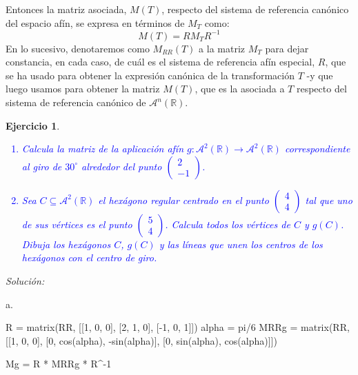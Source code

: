 \documentclass{amsart}
\newtheorem{ejer}{Ejercicio}
\begin{document}
\begin{tcolorbox}[colback = orange!60!white,title = Cuestiones teóricas previas]
Entonces la matriz asociada, $M(T)$, respecto del sistema de referencia canónico del espacio afín,  se expresa en términos de  $M_{T}$ como:
$$M(T)=RM_{T}R^{-1}$$
En lo sucesivo, denotaremos como $M_{RR}(T)$ a la matriz $M_T$ para dejar constancia, en cada caso, de cuál es el sistema de referencia afín especial, $R$, que se ha usado para obtener la expresión canónica de la transformación $T$ -y que luego usamos para obtener la matriz $M(T)$, que es la asociada a $T$ respecto del sistema de referencia canónico de $\mathcal{A}^n(\mathbb R)$.

\end{tcolorbox} 
\newpage

\begin{ejer}	
\textcolor{blue}{\begin{enumerate} 
\item[a)] Calcula la matriz de la aplicación af\'{i}n $g:\mathcal{A}^2(\mathbb R) \to \mathcal{A}^2(\mathbb R)$ correspondiente al {\sc giro} de $30^\circ$ alrededor del punto 
$\left( \begin{array}{r} 2  \\ -1 \end{array} \right)$.
\item[b)] Sea $C \subseteq \mathcal{A}^2(\mathbb R)$ el hex\'agono regular centrado en el punto $\left( \begin{array}{r} 4  \\ 4 \end{array} \right)$ tal que uno de sus v\'ertices
es el punto $\left( \begin{array}{r} 5  \\ 4 \end{array} \right)$. Calcula todos los v\'ertices de $C$ y $g(C)$. Dibuja los hexágonos $C$, $g(C)$ y las líneas que unen los centros de los hexágonos con el centro de giro.
\end{enumerate}}
\end{ejer}

{\it Solución:}


a.

\begin{sageblock}
R = matrix(RR, [[1, 0, 0], [2, 1, 0], [-1, 0, 1]])
alpha = pi/6
MRRg = matrix(RR, [[1, 0, 0], [0, cos(alpha), -sin(alpha)], [0, sin(alpha), cos(alpha)]])

Mg = R * MRRg * R^-1
\end{sageblock}
\end{document}
